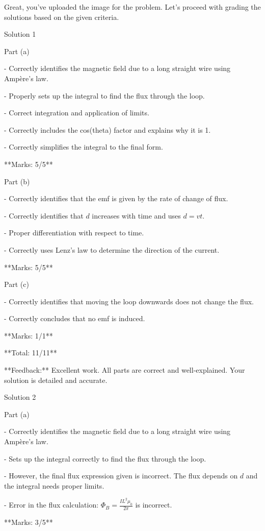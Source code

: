 \documentclass[a4paper,11pt]{article}
\begin{document}
Great, you've uploaded the image for the problem. Let's proceed with grading the solutions based on the given criteria.

Solution 1

Part (a)

- Correctly identifies the magnetic field due to a long straight wire using Ampère's law.

- Properly sets up the integral to find the flux through the loop.

- Correct integration and application of limits.

- Correctly includes the cos(theta) factor and explains why it is 1.

- Correctly simplifies the integral to the final form.

**Marks: 5/5**

Part (b)

- Correctly identifies that the emf is given by the rate of change of flux.

- Correctly identifies that \( d \) increases with time and uses \( d = vt \).

- Proper differentiation with respect to time.

- Correctly uses Lenz's law to determine the direction of the current.

**Marks: 5/5**

Part (c)

- Correctly identifies that moving the loop downwards does not change the flux.

- Correctly concludes that no emf is induced.

**Marks: 1/1**

**Total: 11/11**

**Feedback:** Excellent work. All parts are correct and well-explained. Your solution is detailed and accurate.

Solution 2

Part (a)

- Correctly identifies the magnetic field due to a long straight wire using Ampère's law.

- Sets up the integral correctly to find the flux through the loop.

- However, the final flux expression given is incorrect. The flux depends on \( d \) and the integral needs proper limits.

- Error in the flux calculation: \(\Phi_B = \frac{I L^2 \mu_0}{2 \pi}\) is incorrect.

**Marks: 3/5**
\end{document}
